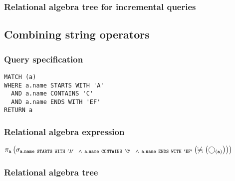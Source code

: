 \subsubsection*{Relational algebra tree for incremental queries}


\subsection{Combining string operators}

\subsubsection*{Query specification}

\begin{lstlisting}
MATCH (a)
WHERE a.name STARTS WITH 'A'
  AND a.name CONTAINS 'C'
  AND a.name ENDS WITH 'EF'
RETURN a
\end{lstlisting}

\subsubsection*{Relational algebra expression}

$\projection{\var{a}} \left(\selection{\mathtt{a.name~STARTS~WITH~'A'
~~\land~a.name~CONTAINS~'C'
~~\land~a.name~ENDS~WITH~'EF'}} \left(\alldifferent{} \left(\getvertices{a}{}\right)\right)\right)$

\subsubsection*{Relational algebra tree}


